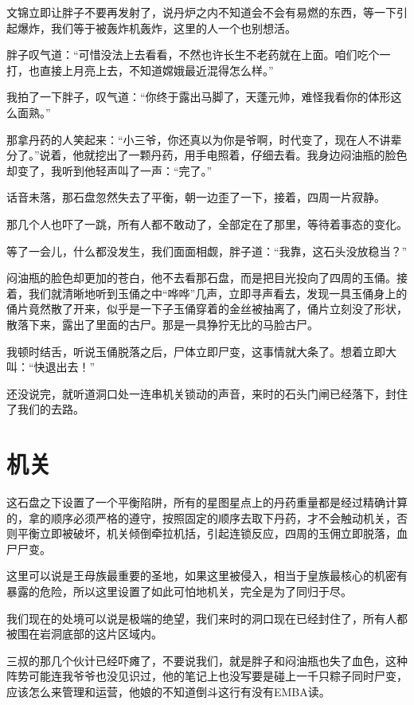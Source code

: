 文锦立即让胖子不要再发射了，说丹炉之内不知道会不会有易燃的东西，等一下引起爆炸，我们等于被轰炸机轰炸，这里的人一个也别想活。

胖子叹气道：“可惜没法上去看看，不然也许长生不老药就在上面。咱们吃个一打，也直接上月亮上去，不知道嫦娥最近混得怎么样。”

我拍了一下胖子，叹气道：“你终于露出马脚了，天蓬元帅，难怪我看你的体形这么面熟。”

那拿丹药的人笑起来：“小三爷，你还真以为你是爷啊，时代变了，现在人不讲辈分了。”说着，他就挖出了一颗丹药，用手电照着，仔细去看。我身边闷油瓶的脸色却变了，我听到他轻声叫了一声：“完了。”

话音未落，那石盘忽然失去了平衡，朝一边歪了一下，接着，四周一片寂静。

那几个人也吓了一跳，所有人都不敢动了，全部定在了那里，等待着事态的变化。

等了一会儿，什么都没发生，我们面面相觑，胖子道：“我靠，这石头没放稳当？”

闷油瓶的脸色却更加的苍白，他不去看那石盘，而是把目光投向了四周的玉俑。接着，我们就清晰地听到玉俑之中“哗哗”几声，立即寻声看去，发现一具玉俑身上的俑片竟然散了开来，似乎是一下子玉俑穿着的金丝被抽离了，俑片立刻没了形状，散落下来，露出了里面的古尸。那是一具狰狞无比的马脸古尸。

我顿时结舌，听说玉俑脱落之后，尸体立即尸变，这事情就大条了。想着立即大叫：“快退出去！”

还没说完，就听道洞口处一连串机关锁动的声音，来时的石头门闸已经落下，封住了我们的去路。

\chapter{机关}

这石盘之下设置了一个平衡陷阱，所有的星图星点上的丹药重量都是经过精确计算的，拿的顺序必须严格的遵守，按照固定的顺序去取下丹药，才不会触动机关，否则平衡立即被破坏，机关倾倒牵拉机括，引起连锁反应，四周的玉佣立即脱落，血尸尸变。

这里可以说是王母族最重要的圣地，如果这里被侵入，相当于皇族最核心的机密有暴露的危险，所以这里设置了如此可怕地机关，完全是为了同归于尽。

我们现在的处境可以说是极端的绝望，我们来时的洞口现在已经封住了，所有人都被围在岩洞底部的这片区域内。

三叔的那几个伙计已经吓瘫了，不要说我们，就是胖子和闷油瓶也失了血色，这种阵势可能连我爷爷也没见识过，他的笔记上也没写要是碰上一千只粽子同时尸变，应该怎么来管理和运营，他娘的不知道倒斗这行有没有EMBA读。


